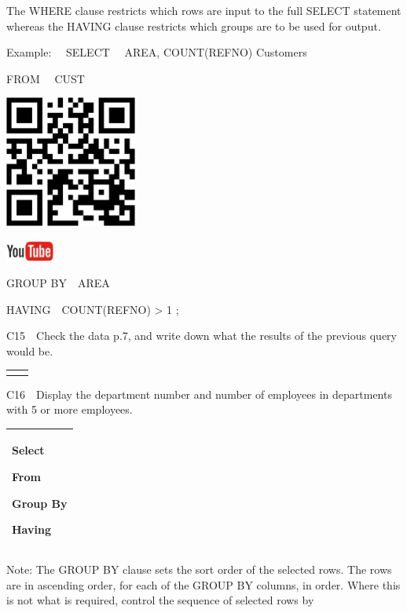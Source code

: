 The WHERE clause restricts which rows are input to the full SELECT statement whereas the HAVING clause restricts which groups are to be used for output.  

Example: \ \ SELECT \ \ AREA, COUNT(REFNO) Customers

FROM \ \ CUST

\begin{center}
\begin{minipage}{4.849cm}
   
\includegraphics[width=4.341cm,height=4.341cm]{images/img (35).png}
 

   
\includegraphics[width=1.582cm,height=0.674cm]{images/img (15).png}
 
\end{minipage}
\end{center}
GROUP BY\ \ AREA

HAVING\ \ COUNT(REFNO) {\textgreater} 1 ;

C15\ \ Check the data p.7, and write down what the results of the previous query would be.

\begin{flushleft}
\tablefirsthead{}
\tablehead{}
\tabletail{}
\tablelasttail{}
\begin{supertabular}{|l|l|}
\hline
 & \\\hline
 & \\\hline
\end{supertabular}
\end{flushleft}
C16\ \ Display the department number and number of employees in departments with 5 or more employees. 

\begin{flushleft}
\tablefirsthead{}
\tablehead{}
\tabletail{}
\tablelasttail{}
\begin{supertabular}{|m{14.583cm}|}
\hline
Select

From

Group By

Having\\\hline
\end{supertabular}
\end{flushleft}
Note: The GROUP BY clause sets the sort order of the selected rows.  The rows are in ascending order, for each of the GROUP BY columns, in order.  Where this is not what is required, control the sequence of selected rows by

